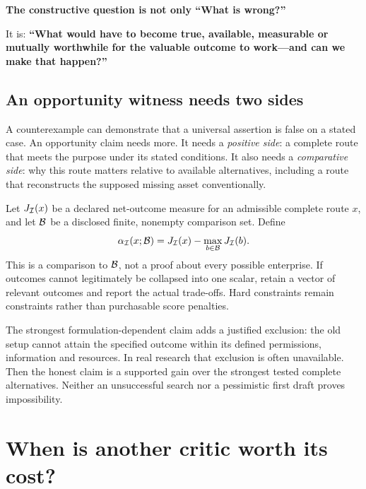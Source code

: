 \begin{seabox}
\textbf{The constructive question is not only ``What is wrong?''}\par
It is: \textbf{``What would have to become true, available, measurable or mutually worthwhile for the valuable outcome to work---and can we make that happen?''}
\end{seabox}

\subsection{An opportunity witness needs two sides}
A counterexample can demonstrate that a universal assertion is false on a stated case. An opportunity claim needs more. It needs a \emph{positive side}: a complete route that meets the purpose under its stated conditions. It also needs a \emph{comparative side}: why this route matters relative to available alternatives, including a route that reconstructs the supposed missing asset conventionally.

Let $J_{\mathcal{I}}(x)$ be a declared net-outcome measure for an admissible complete route $x$, and let $\mathcal{B}$ be a disclosed finite, nonempty comparison set. Define
\begin{equation}
\alpha_{\mathcal{I}}(x;\mathcal{B})=J_{\mathcal{I}}(x)-\max_{b\in\mathcal{B}}J_{\mathcal{I}}(b).
\end{equation}
This is a comparison to $\mathcal{B}$, not a proof about every possible enterprise. If outcomes cannot legitimately be collapsed into one scalar, retain a vector of relevant outcomes and report the actual trade-offs. Hard constraints remain constraints rather than purchasable score penalties.

The strongest formulation-dependent claim adds a justified exclusion: the old setup cannot attain the specified outcome within its defined permissions, information and resources. In real research that exclusion is often unavailable. Then the honest claim is a supported gain over the strongest tested complete alternatives. Neither an unsuccessful search nor a pessimistic first draft proves impossibility.

\section{When is another critic worth its cost?}
\label{sec:value}

